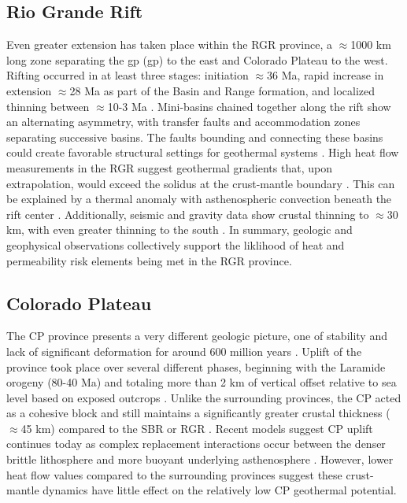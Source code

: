 \subsection{Rio Grande Rift}\label{ch2:rgr_province}
Even greater extension has taken place within the RGR province, a $\approx$1000 km long zone separating the \acrlong{gp} (\acrshort{gp}) to the east and Colorado Plateau to the west. Rifting occurred in at least three stages: initiation $\approx$36 Ma, rapid increase in extension $\approx$28 Ma as part of the Basin and Range formation, and localized thinning between $\approx$10-3 Ma \citep{bielicki_hydrogeolgic_2015,mack_geology_2008,seager_new_1984}. Mini-basins chained together along the rift show an alternating asymmetry, with transfer faults and accommodation zones separating successive basins. The faults bounding and connecting these basins could create favorable structural settings for geothermal systems \citep{faulds_favorable_2015}. High heat flow measurements in the RGR suggest geothermal gradients that, upon extrapolation, would exceed the solidus at the crust-mantle boundary \citep{olsen_rio_1987}. This can be explained by a thermal anomaly with asthenospheric convection beneath the rift center \citep{olsen_rio_1987}. Additionally, seismic and gravity data show crustal thinning to $\approx$30 km, with even greater thinning to the south \citep{keller_rio_1999}. In summary, geologic and geophysical observations collectively support the liklihood of heat and permeability risk elements being met in the RGR province. 

\subsection{Colorado Plateau}\label{ch2:cp_province}
The CP province presents a very different geologic picture, one of stability and lack of significant deformation for around 600 million years \citep{leighty_neogene_1997}. Uplift of the province took place over several different phases, beginning with the Laramide orogeny (80-40 Ma) and totaling more than 2 km of vertical offset relative to sea level based on exposed outcrops \citep{moucha_deep_2009}. Unlike the surrounding provinces, the CP acted as a cohesive block and still maintains a significantly greater crustal thickness ($\approx$45 km) compared to the SBR or RGR \citep{wilson_imaging_2005}. Recent models suggest CP uplift continues today as complex replacement interactions occur between the denser brittle lithosphere and more buoyant underlying asthenosphere \citep{levander_continuing_2011}. However, lower heat flow values compared to the surrounding provinces \citep{thompson_regional_1979} suggest these crust-mantle dynamics have little effect on the relatively low CP geothermal potential.

